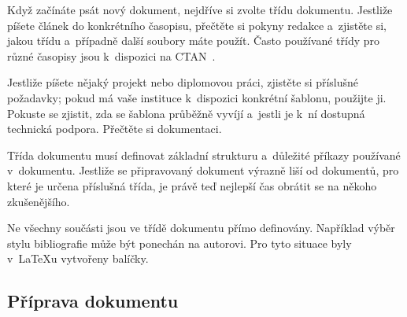 \documentclass{csbulletin}
\begin{document}
Když začínáte psát nový dokument, nejdříve si zvolte třídu dokumentu. Jestliže píšete článek do konkrétního časopisu, přečtěte si pokyny redakce a~zjistěte si, jakou třídu a~případně další soubory máte použít. Často používané třídy pro různé časopisy jsou k~dispozici na CTAN~\cite{ctansearch}.

Jestliže píšete nějaký projekt nebo diplomovou práci, zjistěte si příslušné požadavky; pokud má vaše instituce k~dispozici konkrétní šablonu, použijte ji. Pokuste se zjistit, zda se šablona průběžně vyvíjí a~jestli je k~ní dostupná technická podpora. Přečtěte si dokumentaci.

Třída dokumentu musí definovat základní strukturu a~důležité příkazy používané v~dokumentu. Jestliže se připravovaný dokument výrazně liší od dokumentů, pro které je určena příslušná třída, je právě teď nejlepší čas obrátit se na někoho zkušenějšího.

Ne všechny součásti jsou ve třídě dokumentu přímo definovány. Například výběr stylu bibliografie může být ponechán na autorovi. Pro tyto situace byly v~\LaTeX u vytvořeny balíčky.

\subsection{Příprava dokumentu}
\end{document}
